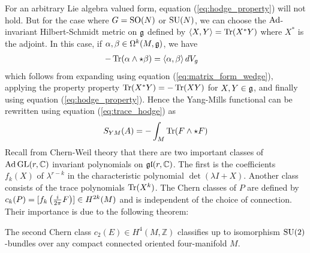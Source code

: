 For an arbitrary Lie algebra valued form, equation (\ref{eq:hodge_property})
will not hold. But for the case where $G=\operatorname{SO}(N)$ or  $\operatorname{SU}(N)$, we can choose the
$\operatorname{Ad}$-invariant Hilbert-Schmidt metric on $\operatorname{\mathfrak{g}}$ defined by
$\gen{X,Y}=\Tr(X^*Y)$ where $X^*$ is the adjoint. 
In this case, if $\alpha,\beta \in \Omega^k(M,\operatorname{\mathfrak{g}})$, we have 
\begin{align} 
	-\Tr(\alpha \wedge \star \beta)
	&= \gen{\alpha,\beta}dV_g \label{eq:trace_hodge}
\end{align} 
which follows from expanding using equation (\ref{eq:matrix_form_wedge}),
applying the property property $\operatorname{Tr}(X^*Y)=-\operatorname{Tr}(XY)$ for $X,Y\in\operatorname{\mathfrak{g}}$, and
finally using equation (\ref{eq:hodge_property}). 
Hence the Yang-Mills functional can be rewritten using equation (\ref{eq:trace_hodge}) as
\[
	S_{YM}(A) 
	=-\int_M \operatorname{Tr} (F\wedge \star F) 
\] 
\noindent
Recall from Chern-Weil theory that there are two important classes of
$\operatorname{Ad} \operatorname{GL}(r,\mathbb{C})$ invariant polynomials on $\operatorname{\mathfrak{gl}}(r,\mathbb{C})$. 
The first is the coefficients $f_k(X)$ of $\lambda^{r-k}$ in the characteristic
polynomial $\det(\lambda I + X)$. Another class consists of the trace
polynomials $\operatorname{Tr}(X^k)$. 
The Chern classes of $P$ are defined by $c_k(P) =
[f_k\paren{\frac{i}{2\pi}F}] \in H^{2k}(M)$ and is independent of the choice of
connection. Their importance is due to the
following theorem:
\begin{thm}
	The second Chern class $c_2(E)\in H^4(M,\mathbb{Z})$ classifies up to
	isomorphism $\operatorname{SU}(2)$-bundles over any compact connected oriented 
	four-manifold $M$. 
\end{thm}


